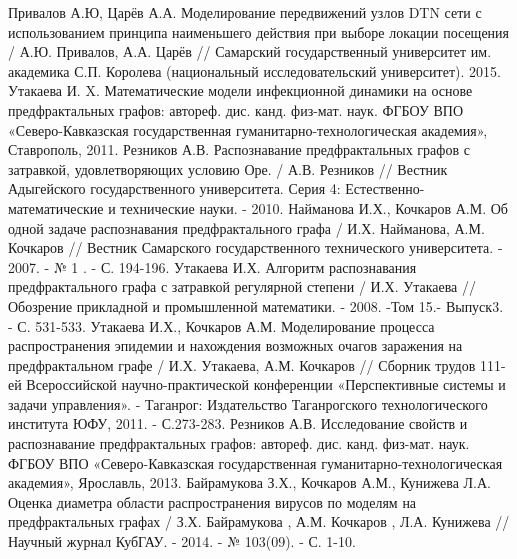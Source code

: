 \begin{thebibliography}{}
	 Привалов А.Ю, Царёв А.А. Моделирование передвижений узлов DTN сети с использованием принципа наименьшего действия при выборе локации посещения / А.Ю. Привалов, А.А. Царёв // Самарский государственный университет им. академика С.П. Королева (национальный исследовательский университет). 2015.
	Утакаева И. X. Математические модели	инфекционной динамики	на основе	предфрактальных графов: автореф. дис.  канд. физ-мат. наук.  ФГБОУ ВПО «Северо-Кавказская	государственная гуманитарно-технологическая академия», Ставрополь, 2011.
	Резников А.В. Распознавание предфрактальных графов с затравкой, удовлетворяющих условию Оре. / А.В. Резников // Вестник Адыгейского государственного университета. Серия 4: Естественно-математические и технические науки. - 2010.
	  Найманова И.Х., Кочкаров А.М. Об одной задаче распознавания предфрактального графа / И.Х. Найманова, А.М. Кочкаров // Вестник Самарского государственного технического университета. - 2007. - № 1 . - С. 194-196.
	Утакаева И.Х. Алгоритм распознавания предфрактального графа с затравкой регулярной степени / И.Х. Утакаева // Обозрение прикладной и промышленной математики. - 2008. -Том 15.- Выпуск3. - С. 531-533.
	Утакаева И.Х., Кочкаров А.М. Моделирование процесса распространения эпидемии и нахождения возможных очагов заражения на предфрактальном графе / И.Х. Утакаева, А.М. Кочкаров // Сборник трудов 111-ей Всероссийской научно-практической конференции «Перспективные системы и задачи управления». - Таганрог: Издательство Таганрогского технологического института ЮФУ, 2011. - С.273-283. 
	 Резников А.В. Исследование свойств и распознавание предфрактальных графов: автореф. дис.  канд. физ-мат. наук.  ФГБОУ ВПО «Северо-Кавказская	государственная гуманитарно-технологическая академия», Ярославль, 2013.
	 Байрамукова З.Х.,	Кочкаров А.М.,	Кунижева Л.А. Оценка диаметра области распространения вирусов по моделям на предфрактальных графах /   З.Х. Байрамукова ,	А.М. Кочкаров , Л.А. Кунижева //	Научный журнал КубГАУ. - 2014. - № 103(09). - С. 1-10.
\end{thebibliography}